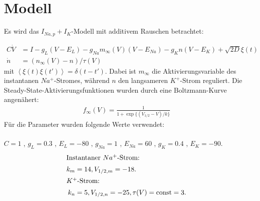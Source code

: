 \documentclass[12pt,a4paper]{article}
\begin{document}

\thispagestyle{empty}
\newpage
\tableofcontents
\thispagestyle{empty}
\newpage
{}

\section{Modell}
Es wird das $I_{Na,p}+I_K$-Modell mit additivem Rauschen betrachtet:

\begin{align*}
C\dot{V} &= I - g_L(V-E_L) - g_{Na}m_{\infty}(V)(V-E_{Na}) - g_Kn(V-E_K)+\sqrt{2D}\xi(t)\\
\dot{n} &= (n_{\infty}(V)-n)/\tau(V)
\end{align*}
mit $\left<\xi(t)\xi(t')\right>=\delta(t-t')$.
Dabei ist $m_{\infty}$ die Aktivierungsvariable des instantanen $Na^+$-Stromes, während $n$ den langsameren $K^+$-Strom reguliert. Die Steady-State-Aktivierungsfunktionen wurden durch eine Boltzmann-Kurve angenähert:
\begin{align*}
f_{\infty}(V) = \frac{1}{1+\exp\{(V_{1/2}-V)/k\}}
\end{align*}
Für die Parameter wurden folgende Werte verwendet:\\\\
$C=1$ , $g_L=0.3$ , $E_L=-80$ , $g_{Na}=1$ , $E_{Na}=60$ , $g_K=0.4$ , $E_K=-90$.
\begin{align*}
\intertext{Instantaner $Na^+$-Strom:} k_m&=14 , V_{1/2,m}=-18. 
\\
\intertext{$K^+$-Strom:} k_n&=5 , V_{1/2,n}=-25 , \tau(V)=\text{const}=3.
\end{align*}
\end{document}
